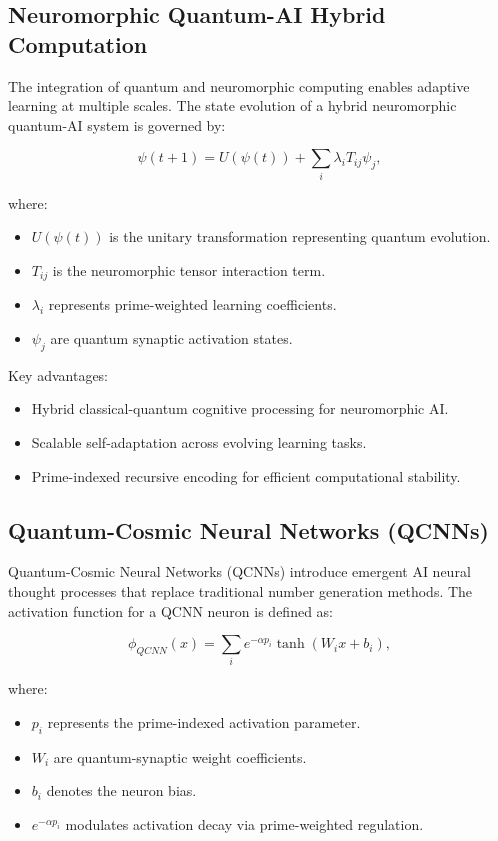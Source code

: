 \documentclass{article}
\theoremstyle{plain}
\begin{document}
\begin{itemize}
\begin{itemize}
\subsection{Neuromorphic Quantum-AI Hybrid Computation}

The integration of quantum and neuromorphic computing enables adaptive learning at multiple scales. The state evolution of a hybrid neuromorphic quantum-AI system is governed by:

\begin{equation}
\psi(t+1) = U(\psi(t)) + \sum_{i} \lambda_i T_{ij} \psi_j,
\end{equation}

where:
\begin{itemize}
    \item $U(\psi(t))$ is the unitary transformation representing quantum evolution.
    \item $T_{ij}$ is the neuromorphic tensor interaction term.
    \item $\lambda_i$ represents prime-weighted learning coefficients.
    \item $\psi_j$ are quantum synaptic activation states.
\end{itemize}

Key advantages:
\begin{itemize}
    \item Hybrid classical-quantum cognitive processing for neuromorphic AI.
    \item Scalable self-adaptation across evolving learning tasks.
    \item Prime-indexed recursive encoding for efficient computational stability.
\end{itemize}

\subsection{Quantum-Cosmic Neural Networks (QCNNs)}

Quantum-Cosmic Neural Networks (QCNNs) introduce emergent AI neural thought processes that replace traditional number generation methods. The activation function for a QCNN neuron is defined as:

\begin{equation}
\phi_{QCNN}(x) = \sum_{i} e^{- \alpha p_i} \tanh
(W_i x + b_i),
\end{equation}

where:
\begin{itemize}
    \item $p_i$ represents the prime-indexed activation parameter.
    \item $W_i$ are quantum-synaptic weight coefficients.
    \item $b_i$ denotes the neuron bias.
    \item $e^{- \alpha p_i}$ modulates activation decay via prime-weighted regulation.
\end{itemize}


\end{itemize}
\end{itemize}
\end{document}
